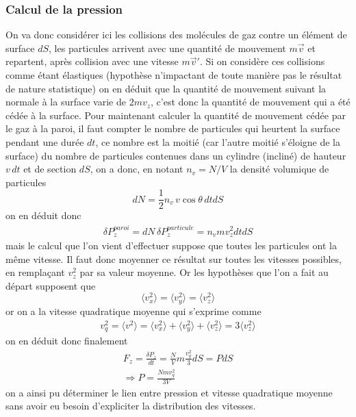 \documentclass[12pt,prb,aps,epsf]{article}
\begin{document}
\subsubsection{Calcul de la pression}
On va donc considérer ici les collisions des molécules de gaz contre un élément de surface $dS$, les particules arrivent avec une quantité de mouvement $m\vec{v}$ et repartent, après collision avec une vitesse $m\vec{v}'$. Si on considère ces collisions comme étant élastiques (hypothèse n'impactant de toute manière pas le résultat de nature statistique) on en déduit que la quantité de mouvement suivant la normale à la surface varie de $2mv_z$, c'est donc la quantité de mouvement qui a été cédée à la surface. Pour maintenant calculer la quantité de mouvement cédée par le gaz à la paroi, il faut compter le nombre de particules qui heurtent la surface pendant une durée $dt$, ce nombre est la moitié (car l'autre moitié s'éloigne de la surface) du nombre de particules contenues dans un cylindre (incliné) de hauteur $v\,dt$ et de section $dS$, on a donc, en notant $n_v = N/V$ la densité volumique de particules 
\begin{equation}
dN = \frac{1}{2} n_v\,v\cos\theta\, dt dS
\end{equation}
on en déduit donc 
\begin{eqnarray}
\delta P_z^{paroi} = dN \,\delta P_z^{particule} = n_v m v_z^2 dt dS
\end{eqnarray}
mais le calcul que l'on vient d'effectuer suppose que toutes les particules ont la même vitesse. Il faut donc moyenner ce résultat sur toutes les vitesses possibles, en remplaçant $v_z^2$ par sa valeur moyenne. Or les hypothèses que l'on a fait au départ supposent que 
\begin{equation}
\langle v_x^2 \rangle =\langle v_y^2 \rangle = \langle v_z^2 \rangle
\end{equation}
or on a la vitesse quadratique moyenne qui s'exprime comme 
\begin{eqnarray}
v_q^2=\langle v^2 \rangle = \langle v_x^2 \rangle + \langle v_y^2 \rangle + \langle v_z^2 \rangle = 3\langle v_z^2 \rangle
\end{eqnarray}
on en déduit donc finalement 
\begin{eqnarray}
F_z = \frac{\delta P_z}{dt} = \frac{N}{V}  m \frac{v_q^2}{3} dS = PdS\\
\Longrightarrow P = \frac{ Nmv_q^2}{3V}
\end{eqnarray}
on a ainsi pu déterminer le lien entre pression et vitesse quadratique moyenne sans avoir eu besoin d'expliciter la distribution des vitesses.
\end{document}
